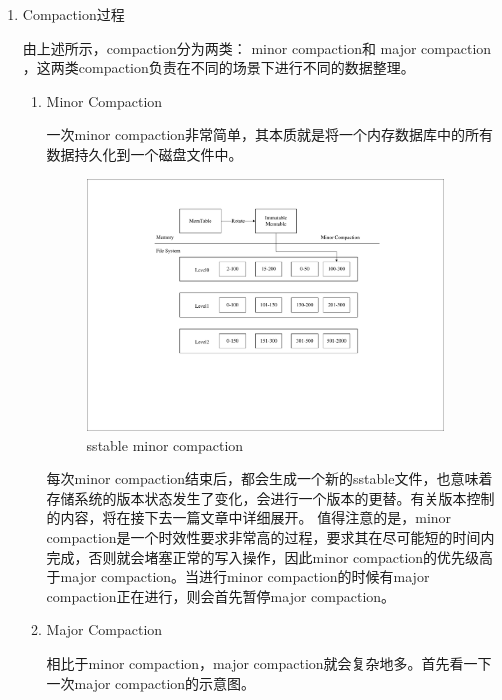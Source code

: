 \begin{enumerate}
\begin{enumerate}
				
				
			\end{enumerate}

			\item Compaction过程 
			
			由上述所示，compaction分为两类：
				minor compaction和				major compaction
				，这两类compaction负责在不同的场景下进行不同的数据整理。
			\begin{enumerate}
				\item Minor Compaction
				
				一次minor compaction非常简单，其本质就是将一个内存数据库中的所有数据持久化到一个磁盘文件中。
				
				\begin{figure}[H]
					\centering
					\includegraphics[width=0.95\textwidth]{pdf/minor_compaction.pdf}
					\caption{sstable minor compaction}
					\label{sstable_minor_compaction}
				\end{figure}
				
				每次minor compaction结束后，都会生成一个新的sstable文件，也意味着存储系统的版本状态发生了变化，会进行一个版本的更替。有关版本控制的内容，将在接下去一篇文章中详细展开。
				值得注意的是，minor compaction是一个时效性要求非常高的过程，要求其在尽可能短的时间内完成，否则就会堵塞正常的写入操作，因此minor compaction的优先级高于major compaction。当进行minor compaction的时候有major compaction正在进行，则会首先暂停major compaction。
				
				\item Major Compaction
				
				相比于minor compaction，major compaction就会复杂地多。首先看一下一次major compaction的示意图。
				

\end{enumerate}
\end{enumerate}
